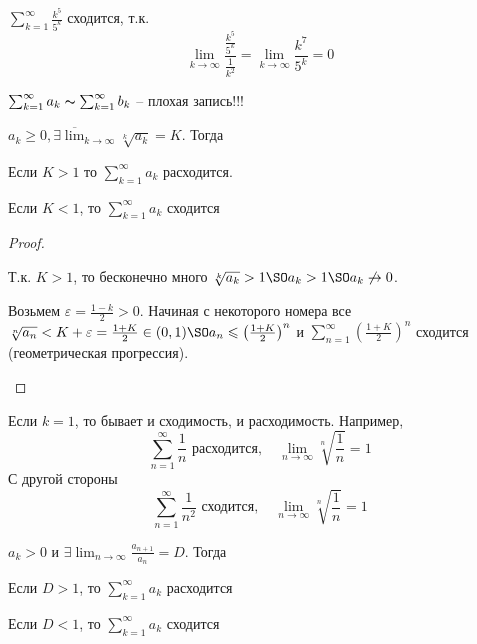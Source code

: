 \begin{Example}
	$\sum_{k=1}^{\infty} \frac{k^5}{5^k}$ сходится, т.к.
	\[\lim_{k \to \infty} \frac{ \frac{k^5}{5^k}}{\frac{1}{k^2}} = \lim_{k \to \infty} \frac{k^7}{5^k} = 0\] 
\end{Example}

\begin{Rem}
	$\sum_{k=1}^{\infty} a_k \thicksim \sum_{k=1}^{\infty} b_k$ -- плохая запись!!! 
\end{Rem}

\begin{Thm}
	$a_k \geqslant 0, \exists \overline{\lim}_{k \to \infty} \sqrt[k]{a_k} = K$. Тогда
	\begin{MyList}
		\item Если $K > 1$ то $\sum_{k=1}^{\infty} a_k$ расходится.
		\item Если $K < 1$, то $\sum_{k=1}^{\infty} a_k$ сходится  
	\end{MyList} 
\end{Thm}

\begin{proof}
	\begin{MyList}
		\item Т.к. $K > 1$, то бесконечно много $\sqrt[k]{a_k} > 1 \SO a_k > 1 \SO a_k \not\to 0$.
		\item Возьмем $\varepsilon = \frac{1 - k}{2} > 0$. Начиная с некоторого номера все $\sqrt[n]{a_n} < K + \varepsilon = \frac{1 + K}{2} \in (0, 1) \SO a_n \leqslant \left( \frac{1 + K}{2}\right)^n $ и $\sum_{n=1}^{\infty} \left( \frac{1 + K}{2}\right)^n$ сходится (геометрическая прогрессия).  
	\end{MyList}
\end{proof}

\begin{Rem}
	Если $k = 1$, то бывает и сходимость, и расходимость. Например,
	\[\sum_{n=1}^{\infty} \frac{1}{n} \text{ расходится}, \quad \lim_{n \to \infty} \sqrt[n]{\frac{1}{n}} = 1\]
	С другой стороны
	\[\sum_{n=1}^{\infty} \frac{1}{n^2} \text{ сходится}, \quad \lim_{n \to \infty} \sqrt[n]{\frac{1}{n}} = 1\]
\end{Rem}

\begin{Thm}
	$a_k > 0$ и $\exists \lim_{n \to \infty} \frac{a_{n + 1}}{a_n} = D$. Тогда
	\begin{MyList}
		\item Если $D > 1$, то $\sum_{k=1}^{\infty} a_k$ расходится
		\item Если $D < 1$, то $\sum_{k=1}^{\infty} a_k$ сходится
	\end{MyList} 
\end{Thm}

